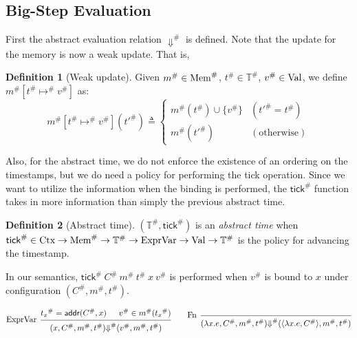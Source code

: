 \documentclass{article}
\theoremstyle{definition}
\newtheorem{definition}{Definition}[section]
\newcommand*{\A}[1]{{#1}^{\#}}
\newcommand*{\ExprVar}{\text{ExprVar}}
\newcommand*{\Time}{\mathbb{T}}
\newcommand*{\ATime}{\A{\Time}}
\newcommand*{\Ctx}[1]{\text{Ctx}\vphantom{#1}}
\newcommand*{\Value}[1]{\text{Val}\vphantom{#1}}
\newcommand*{\mem}{m}
\newcommand*{\AMem}[1]{\A{\text{Mem}}\vphantom{#1}}
\newcommand*{\addr}{\mathsf{addr}}
\newcommand*{\tick}{\mathsf{tick}}
\begin{document}
\subsection{Big-Step Evaluation}

First the abstract evaluation relation $\A{\Downarrow}$ is defined.
Note that the update for the memory is now a weak update. That is,
\begin{definition}[Weak update]
  Given $\A{\mem}\in\AMem{\ATime}$, $\A{t}\in\ATime$, $\A{v}\in\Value{\ATime}$, we define $\A{\mem}[\A{t}\A{\mapsto}\A{v}]$ as:
  \[
    \A{\mem}[\A{t}\A{\mapsto}\A{v}](\A{t'})\triangleq
    \begin{cases}
      \A{\mem}(\A{t})\cup\{\A{v}\} & (\A{t'}=\A{t})     \\
      \A{\mem}(\A{t'})             & (\text{otherwise})
    \end{cases}
  \]
\end{definition}

Also, for the abstract time, we do not enforce the existence of an ordering on the timestamps, but we do need a policy for performing the tick operation.
Since we want to utilize the information when the binding is performed, the $\A{\tick}$ function takes in more information than simply the previous abstract time.
\begin{definition}[Abstract time]
  $(\ATime,\A{\tick})$ is an \emph{abstract time} when $\A{\tick}\in\Ctx{\ATime}\rightarrow\AMem{\ATime}\rightarrow\ATime\rightarrow\ExprVar\rightarrow\Value{\ATime}\rightarrow\ATime$ is the policy for advancing the timestamp.
\end{definition}
In our semantics, $\A{\tick}\:\A{C}\:\A{\mem}\:\A{t}\:x\:\A{v}$ is performed when $\A{v}$ is bound to $x$ under configuration $(\A{C},\A{\mem},\A{t})$.

\[
  \begin{prooftree}
    \hypo{\A{t_{x}}=\addr(\A{C},x)}
    \hypo{\A{v}\in\A{\mem}(\A{t_{x}})}
    \infer[left label=ExprVar]2{
    (x, \A{C}, \A{\mem}, \A{t})
    \A{\Downarrow}
    (\A{v}, \A{\mem}, \A{t})
    }
  \end{prooftree}\qquad
  \begin{prooftree}
    \infer[left label=Fn]0{
    (\lambda x.e, \A{C}, \A{\mem}, \A{t})
    \A{\Downarrow}
    (\langle\lambda x.e, \A{C}\rangle, \A{\mem}, \A{t})
    }
  \end{prooftree}
\]
\end{document}

